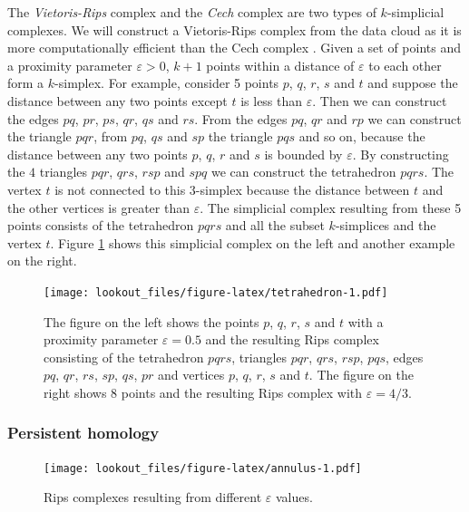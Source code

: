 \documentclass[11pt,a4paper,]{article}
\theoremstyle{definition}
\theoremstyle{definition}
\theoremstyle{definition}
\theoremstyle{remark}
\begin{document}
The \emph{Vietoris-Rips} complex and the \emph{Cech} complex are two types of \(k\)-simplicial complexes. We will construct a Vietoris-Rips complex from the data cloud as it is more computationally efficient than the Cech complex \autocite{ghrist2008barcodes}. Given a set of points and a proximity parameter \(\varepsilon > 0\), \(k+1\) points within a distance of \(\varepsilon\) to each other form a \(k\)-simplex. For example, consider 5 points \(p\), \(q\), \(r\), \(s\) and \(t\) and suppose the distance between any two points except \(t\) is less than \(\varepsilon\). Then we can construct the edges \(pq\), \(pr\), \(ps\), \(qr\), \(qs\) and \(rs\). From the edges \(pq\), \(qr\) and \(rp\) we can construct the triangle \(pqr\), from \(pq\), \(qs\) and \(sp\) the triangle \(pqs\) and so on, because the distance between any two points \(p\), \(q\), \(r\) and \(s\) is bounded by \(\varepsilon\). By constructing the \(4\) triangles \(pqr\), \(qrs\), \(rsp\) and \(spq\) we can construct the tetrahedron \(pqrs\). The vertex \(t\) is not connected to this \(3\)-simplex because the distance between \(t\) and the other vertices is greater than \(\varepsilon\). The simplicial complex resulting from these 5 points consists of the tetrahedron \(pqrs\) and all the subset \(k\)-simplices and the vertex \(t\). Figure \ref{fig:tetrahedron} shows this simplicial complex on the left and another example on the right.

\begin{figure}
\centering
\texttt{[image: lookout\_files/figure-latex/tetrahedron-1.pdf]}
\caption{\label{fig:tetrahedron}The figure on the left shows the points \(p\), \(q\), \(r\), \(s\) and \(t\) with a proximity parameter \(\varepsilon = 0.5\) and the resulting Rips complex consisting of the tetrahedron \(pqrs\), triangles \(pqr\), \(qrs\), \(rsp\), \(pqs\), edges \(pq\), \(qr\), \(rs\), \(sp\), \(qs\), \(pr\) and vertices \(p\), \(q\), \(r\), \(s\) and \(t\). The figure on the right shows \(8\) points and the resulting Rips complex with \(\varepsilon=4/3\).}
\end{figure}

\hypertarget{persistent-homology}{%
\subsubsection*{Persistent homology}\label{persistent-homology}}

\begin{figure}
\centering
\texttt{[image: lookout\_files/figure-latex/annulus-1.pdf]}
\caption{\label{fig:annulus}Rips complexes resulting from different \(\varepsilon\) values.}
\end{figure}
\end{document}
